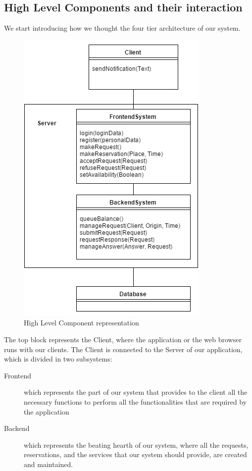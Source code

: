 	\subsection{High Level Components and their interaction}
	We start introducing how we thought the four tier architecture of our system.
	\begin{figure}[h!]
		\begin{center}
			\includegraphics[height=0.5\textheight]{../SE2_IMAGES/HLC}
			\caption{High Level Component representation}
		\end{center}
	\end{figure}
	The top block represents the Client, where the application or the web browser runs with our	clients.
	The Client is connected to the Server of our application, which is divided in two subsystems:
	\begin{description}
		\item[Frontend] which represents the part of our system that provides to the client all the necessary
		functions to perform all the functionalities that are required by the application
		\item[Backend] which represents the beating hearth of our system, where all the requests, reservations,
		and the services that our system should provide, are created and maintained.
	\end{description}
